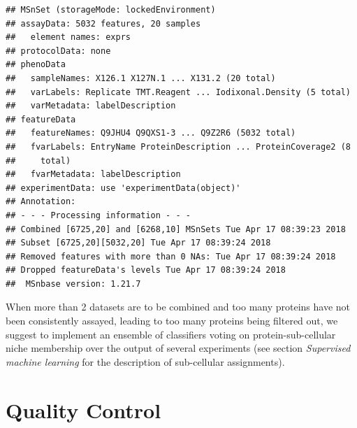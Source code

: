 \begin{knitrout}
\color{fgcolor}\begin{kframe}
\begin{alltt}
 \hlkwb{<-} 
\end{alltt}
\begin{verbatim}
## MSnSet (storageMode: lockedEnvironment)
## assayData: 5032 features, 20 samples 
##   element names: exprs 
## protocolData: none
## phenoData
##   sampleNames: X126.1 X127N.1 ... X131.2 (20 total)
##   varLabels: Replicate TMT.Reagent ... Iodixonal.Density (5 total)
##   varMetadata: labelDescription
## featureData
##   featureNames: Q9JHU4 Q9QXS1-3 ... Q9Z2R6 (5032 total)
##   fvarLabels: EntryName ProteinDescription ... ProteinCoverage2 (8
##     total)
##   fvarMetadata: labelDescription
## experimentData: use 'experimentData(object)'
## Annotation:  
## - - - Processing information - - -
## Combined [6725,20] and [6268,10] MSnSets Tue Apr 17 08:39:23 2018 
## Subset [6725,20][5032,20] Tue Apr 17 08:39:24 2018 
## Removed features with more than 0 NAs: Tue Apr 17 08:39:24 2018 
## Dropped featureData's levels Tue Apr 17 08:39:24 2018 
##  MSnbase version: 1.21.7
\end{verbatim}
\end{kframe}
\end{knitrout}

When more than 2 datasets are to be combined and too many proteins
have not been consistently assayed, leading to too many proteins being
filtered out, we suggest to implement an ensemble of classifiers
voting on protein-sub-cellular niche membership over the output of
several experiments (see section \textit{Supervised machine learning}
for the description of sub-cellular assignments).

\section*{Quality Control}


